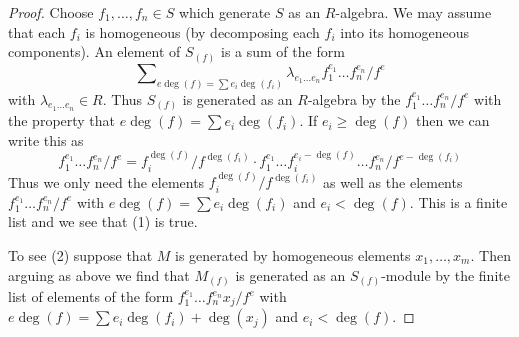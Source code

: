 \documentclass[10pt,a4paper]{amsart}
\theoremstyle{plain}
\theoremstyle{definition}
\theoremstyle{remark}
\numberwithin{equation}{subsection}
\begin{document}
\begin{proof}
Choose $f_1, \ldots, f_n \in S$ which generate $S$ as an $R$-algebra.
We may assume that each $f_i$ is homogeneous (by decomposing each $f_i$
into its homogeneous components). An element of $S_{(f)}$ is a sum
of the form
$$
\sum\nolimits_{e\deg(f) =
\sum e_i\deg(f_i)} \lambda_{e_1 \ldots e_n} f_1^{e_1} \ldots f_n^{e_n}/f^e
$$
with $\lambda_{e_1 \ldots e_n} \in R$. Thus $S_{(f)}$ is generated
as an $R$-algebra by the $f_1^{e_1} \ldots f_n^{e_n} /f^e$ with the
property that $e\deg(f) = \sum e_i\deg(f_i)$. If $e_i \geq \deg(f)$
then we can write this as
$$
f_1^{e_1} \ldots f_n^{e_n}/f^e =
f_i^{\deg(f)}/f^{\deg(f_i)} \cdot
f_1^{e_1} \ldots f_i^{e_i - \deg(f)} \ldots f_n^{e_n}/f^{e - \deg(f_i)}
$$
Thus we only need the elements $f_i^{\deg(f)}/f^{\deg(f_i)}$ as well
as the elements $f_1^{e_1} \ldots f_n^{e_n} /f^e$ with
$e \deg(f) = \sum e_i \deg(f_i)$ and $e_i < \deg(f)$.
This is a finite list and we see that (1) is true.

\medskip\noindent
To see (2) suppose that $M$ is generated by homogeneous elements
$x_1, \ldots, x_m$. Then arguing
as above we find that $M_{(f)}$ is generated as an $S_{(f)}$-module
by the finite list of elements of the form
$f_1^{e_1} \ldots f_n^{e_n} x_j /f^e$
with $e \deg(f) = \sum e_i \deg(f_i) + \deg(x_j)$ and
$e_i < \deg(f)$.
\end{proof}
\end{document}
